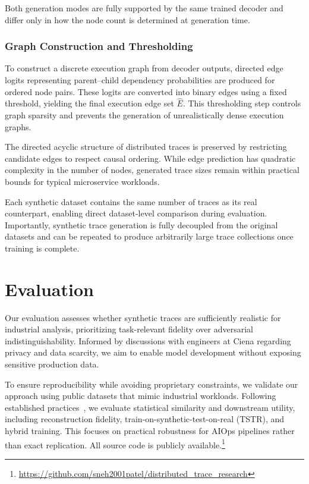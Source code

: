 \documentclass[sigconf,review]{acmart}
\begin{document}
Both generation modes are fully supported by the same trained decoder and differ only in how the node count is determined at generation time.

\subsubsection{Graph Construction and Thresholding}

To construct a discrete execution graph from decoder outputs, directed edge logits representing parent--child dependency probabilities are produced for ordered node pairs. These logits are converted into binary edges using a fixed threshold, yielding the final execution edge set $\hat{E}$. This thresholding step controls graph sparsity and prevents the generation of unrealistically dense execution graphs.

The directed acyclic structure of distributed traces is preserved by restricting candidate edges to respect causal ordering. While edge prediction has quadratic complexity in the number of nodes, generated trace sizes remain within practical bounds for typical microservice workloads.

Each synthetic dataset contains the same number of traces as its real counterpart, enabling direct dataset-level comparison during evaluation. Importantly, synthetic trace generation is fully decoupled from the original datasets and can be repeated to produce arbitrarily large trace collections once training is complete.



\section{Evaluation}
\label{sec:evaluation}

Our evaluation assesses whether synthetic traces are sufficiently realistic for industrial analysis, prioritizing task-relevant fidelity over adversarial indistinguishability. Informed by discussions with engineers at Ciena regarding privacy and data scarcity, we aim to enable model development without exposing sensitive production data. 

To ensure reproducibility while avoiding proprietary constraints, we validate our approach using public datasets that mimic industrial workloads. Following established practices~\cite{esteban2017real,goncalves2020generation}, we evaluate statistical similarity and downstream utility, including reconstruction fidelity, train-on-synthetic-test-on-real (TSTR), and hybrid training. This focuses on practical robustness for AIOps pipelines rather than exact replication. All source code is publicly available.\footnote{\url{https://github.com/sneh2001patel/distributed_trace_research}}
\end{document}

